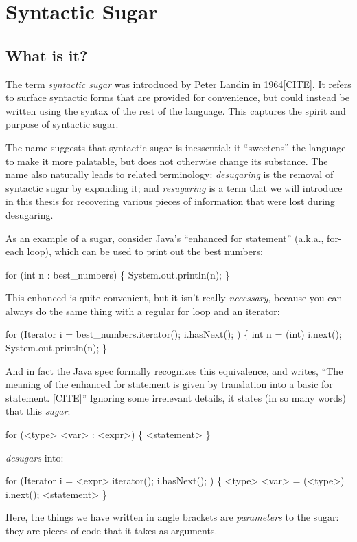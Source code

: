 \chapter{Syntactic Sugar}

\section{What is it?}

The term \emph{syntactic sugar} was introduced by Peter Landin in
1964[CITE]. It refers to surface syntactic forms that are provided for
convenience, but could instead be written using the syntax of the rest
of the language. This captures the spirit and purpose of syntactic
sugar.

The name suggests that syntactic sugar is inessential: it ``sweetens''
the language to make it more palatable, but does not otherwise change
its substance. The name also naturally leads to related terminology:
\emph{desugaring} is the removal of syntactic sugar by expanding it;
and \emph{resugaring} is a term that we will introduce in this thesis
for recovering various pieces of information that were lost during
desugaring.

As an example of a sugar, consider Java's ``enhanced for statement''
(a.k.a., for-each loop), which can be used to print out the best
numbers:
\begin{Codes}
for (int n : best_numbers) \{
  System.out.println(n);
\}
\end{Codes}
This enhanced  is quite convenient, but it isn't really
\emph{necessary}, because you can always do the same thing with a
regular for loop and an iterator:
\begin{Codes}
for (Iterator i = best_numbers.iterator(); i.hasNext(); ) \{
  int n = (int) i.next();
  System.out.println(n);
\}
\end{Codes}

And in fact the Java spec formally recognizes this equivalence, and
writes, ``The meaning of the enhanced for statement is given by
translation into a basic for statement. [CITE]'' Ignoring some
irrelevant details, it states (in so many words) that this \emph{sugar}:
\begin{Codes}
for (<type> <var> : <expr>) \{ <statement> \}
\end{Codes}
\emph{desugars} into:
\begin{Codes}
for (Iterator i = <expr>.iterator(); i.hasNext(); ) \{
  <type> <var> = (<type>) i.next();
  <statement>
\}
\end{Codes}
Here, the things we have written in angle brackets are
\emph{parameters} to the sugar: they are pieces of code that it
takes as arguments.

